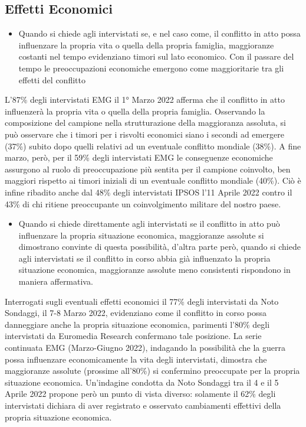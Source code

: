 \documentclass[
]{book}
\providecommand{\tightlist}{%
  \setlength{\itemsep}{0pt}\setlength{\parskip}{0pt}}
\begin{document}
\hypertarget{effetti-economici}{%
\subsection{Effetti Economici}\label{effetti-economici}}

\begin{itemize}
\tightlist
\item
  Quando si chiede agli intervistati se, e nel caso come, il conflitto in atto possa influenzare la propria vita o quella della propria famiglia, maggioranze costanti nel tempo evidenziano timori sul lato economico. Con il passare del tempo le preoccupazioni economiche emergono come maggioritarie tra gli effetti del conflitto
\end{itemize}

L'87\% degli intervistati EMG il 1° Marzo 2022 afferma che il conflitto in atto influenzerà la propria vita o quella della propria famiglia. Osservando la composizione del campione nella strutturazione della maggioranza assoluta, si può osservare che i timori per i risvolti economici siano i secondi ad emergere (37\%) subito dopo quelli relativi ad un eventuale conflitto mondiale (38\%). A fine marzo, però, per il 59\% degli intervistati EMG le conseguenze economiche assurgono al ruolo di preoccupazione più sentita per il campione coinvolto, ben maggiori rispetto ai timori iniziali di un eventuale conflitto mondiale (40\%).
Ciò è infine ribadito anche dal 48\% degli intervistati IPSOS l'11 Aprile 2022 contro il 43\% di chi ritiene preoccupante un coinvolgimento militare del nostro paese.

\begin{itemize}
\tightlist
\item
  Quando si chiede direttamente agli intervistati se il conflitto in atto può influenzare la propria situazione economica, maggioranze assolute si dimostrano convinte di questa possibilità, d'altra parte però, quando si chiede agli intervistati se il conflitto in corso abbia già influenzato la propria situazione economica, maggioranze assolute meno consistenti rispondono in maniera affermativa.
\end{itemize}

Interrogati sugli eventuali effetti economici il 77\% degli intervistati da Noto Sondaggi, il 7-8 Marzo 2022, evidenziano come il conflitto in corso possa danneggiare anche la propria situazione economica, parimenti l'80\% degli intervistati da Euromedia Research confermano tale posizione. La serie continuata EMG (Marzo-Giugno 2022), indagando la possibilità che la guerra possa influenzare economicamente la vita degli intervistati, dimostra che maggioranze assolute (prossime all'80\%) si confermino preoccupate per la propria situazione economica.
Un'indagine condotta da Noto Sondaggi tra il 4 e il 5 Aprile 2022 propone però un punto di vista diverso: solamente il 62\% degli intervistati dichiara di aver registrato e osservato cambiamenti effettivi della propria situazione economica.
\end{document}

